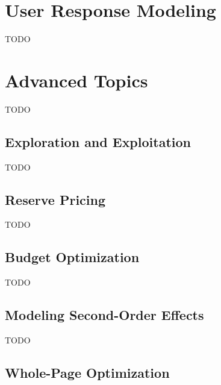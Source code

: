 \documentclass[prodmode,acmtist]{acmsmall} %
\begin{document}
\section{User Response Modeling} %
\label{sec:user_response_modeling}

TODO


\section{Advanced Topics} %
\label{sec:advanced_topics}

TODO


\subsection{Exploration and Exploitation} %
\label{sub:exploration_and_exploitation}
TODO


\subsection{Reserve Pricing} %
\label{sub:reserve_pricing}

TODO


\subsection{Budget Optimization} %
\label{sub:budget_optimization}

TODO


\subsection{Modeling Second-Order Effects} %
\label{sub:modeling_second_order_effects}

TODO


\subsection{Whole-Page Optimization} %
\label{sub:whole_page_optimization}
\end{document}
